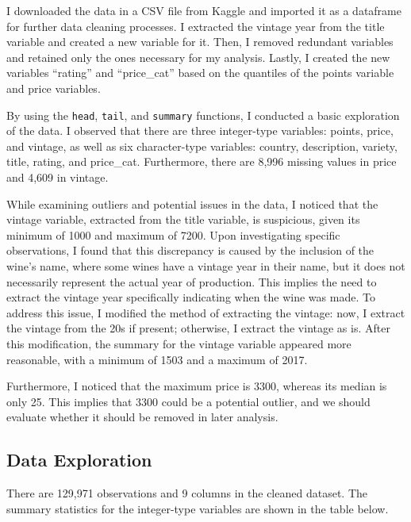 \documentclass[
]{article}
\begin{document}
I downloaded the data in a CSV file from Kaggle and imported it as a
dataframe for further data cleaning processes. I extracted the vintage
year from the title variable and created a new variable for it. Then, I
removed redundant variables and retained only the ones necessary for my
analysis. Lastly, I created the new variables ``rating'' and
``price\_cat'' based on the quantiles of the points variable and price
variables.

By using the \texttt{head}, \texttt{tail}, and \texttt{summary}
functions, I conducted a basic exploration of the data. I observed that
there are three integer-type variables: points, price, and vintage, as
well as six character-type variables: country, description, variety,
title, rating, and price\_cat. Furthermore, there are 8,996 missing
values in price and 4,609 in vintage.

While examining outliers and potential issues in the data, I noticed
that the vintage variable, extracted from the title variable, is
suspicious, given its minimum of 1000 and maximum of 7200. Upon
investigating specific observations, I found that this discrepancy is
caused by the inclusion of the wine's name, where some wines have a
vintage year in their name, but it does not necessarily represent the
actual year of production. This implies the need to extract the vintage
year specifically indicating when the wine was made. To address this
issue, I modified the method of extracting the vintage: now, I extract
the vintage from the 20s if present; otherwise, I extract the vintage as
is. After this modification, the summary for the vintage variable
appeared more reasonable, with a minimum of 1503 and a maximum of 2017.

Furthermore, I noticed that the maximum price is 3300, whereas its
median is only 25. This implies that 3300 could be a potential outlier,
and we should evaluate whether it should be removed in later analysis.

\hypertarget{data-exploration}{%
\subsection{Data Exploration}\label{data-exploration}}

There are 129,971 observations and 9 columns in the cleaned dataset. The
summary statistics for the integer-type variables are shown in the table
below.
\end{document}
